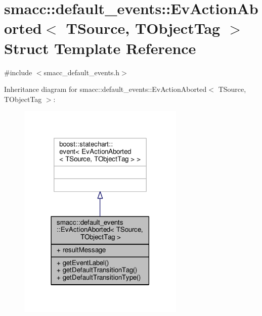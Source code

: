 \hypertarget{structsmacc_1_1default__events_1_1EvActionAborted}{}\section{smacc\+:\+:default\+\_\+events\+:\+:Ev\+Action\+Aborted$<$ T\+Source, T\+Object\+Tag $>$ Struct Template Reference}
\label{structsmacc_1_1default__events_1_1EvActionAborted}


{\ttfamily \#include $<$smacc\+\_\+default\+\_\+events.\+h$>$}



Inheritance diagram for smacc\+:\+:default\+\_\+events\+:\+:Ev\+Action\+Aborted$<$ T\+Source, T\+Object\+Tag $>$\+:\nopagebreak
\begin{figure}[H]
\begin{center}
\leavevmode
\includegraphics[width=225pt]{structsmacc_1_1default__events_1_1EvActionAborted__inherit__graph}
\end{center}
\end{figure}


